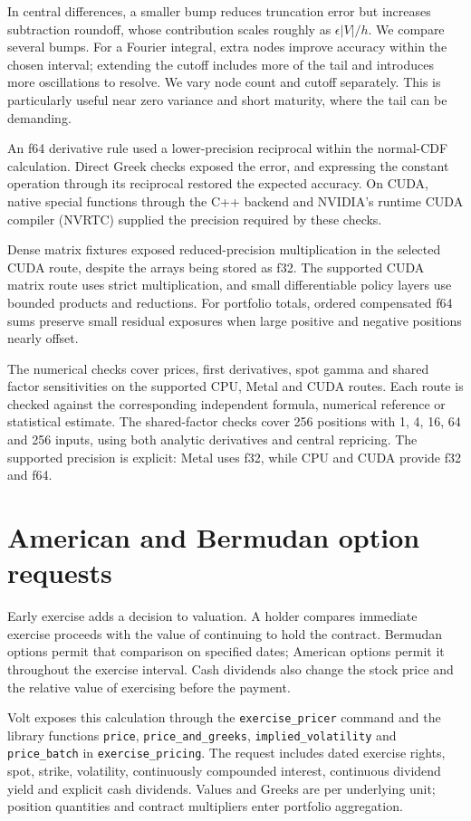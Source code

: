 \documentclass[8pt]{strategynet-journal}
\begin{document}
\begin{SNcolumns}
In central differences, a smaller bump reduces truncation error but increases subtraction roundoff,
whose contribution scales roughly as $\epsilon |V|/h$. We compare several
bumps. For a Fourier integral, extra nodes improve accuracy within the chosen
interval; extending the cutoff includes more of the tail and introduces more
oscillations to resolve. We vary node count and cutoff separately. This is
particularly useful near zero variance and short maturity, where the tail can
be demanding.

An f64 derivative rule used a lower-precision reciprocal within the normal-CDF
calculation. Direct Greek checks exposed the error, and expressing the constant
operation through its reciprocal restored the expected accuracy. On CUDA,
native special functions through the C++ backend and NVIDIA's runtime CUDA
compiler (NVRTC) supplied the precision required by these checks.

Dense matrix fixtures exposed reduced-precision multiplication in the selected
CUDA route, despite the arrays being stored as f32. The supported CUDA matrix route uses
strict multiplication, and small differentiable policy layers use bounded
products and reductions. For portfolio totals, ordered compensated f64 sums
preserve small residual exposures when large positive and negative positions
nearly offset.

The numerical checks cover prices, first derivatives, spot gamma and shared
factor sensitivities on the supported CPU, Metal and CUDA routes. Each route
is checked against the corresponding independent formula, numerical reference
or statistical estimate. The shared-factor checks cover 256 positions with
1, 4, 16, 64 and 256 inputs, using both analytic derivatives and central
repricing. The supported precision is explicit: Metal uses f32,
while CPU and CUDA provide f32 and f64.

\section{American and Bermudan option requests}
Early exercise adds a decision to valuation. A holder compares immediate
exercise proceeds with the value of continuing to hold the contract.
Bermudan options permit that comparison on specified dates; American options
permit it throughout the exercise interval. Cash dividends also change the
stock price and the relative value of exercising before the payment.

Volt exposes this calculation through the \texttt{exercise\_pricer} command
and the library functions \texttt{price}, \texttt{price\_and\_greeks},
\texttt{implied\_volatility} and \texttt{price\_batch} in
\texttt{exercise\_pricing}. The request includes dated exercise rights, spot,
strike, volatility, continuously compounded interest, continuous dividend
yield and explicit cash dividends. Values and Greeks are per underlying unit;
position quantities and contract multipliers enter portfolio aggregation.


\end{SNcolumns}
\end{document}
